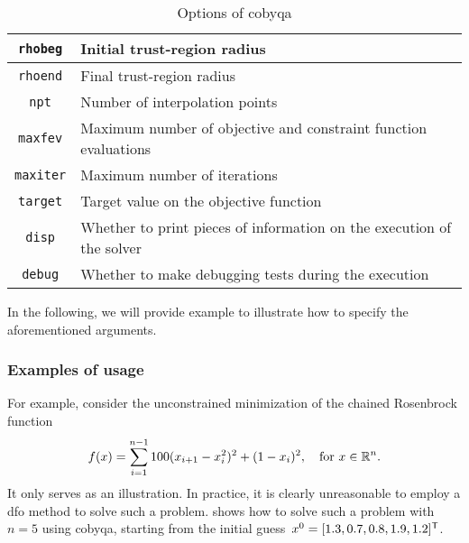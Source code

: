 \begin{table}[ht]
    \caption{Options of \gls{cobyqa}}
    \label{tab:cobyqa-options}
    \centering
    \begin{tabularx}{\textwidth}{cX}
        \toprule
        \texttt{rhobeg}     & Initial trust-region radius\\
        \midrule
        \texttt{rhoend}     & Final trust-region radius\\
        \midrule
        \texttt{npt}        & Number of interpolation points\\
        \midrule
        \texttt{maxfev}     & Maximum number of objective and constraint function evaluations\\
        \midrule
        \texttt{maxiter}    & Maximum number of iterations\\
        \midrule
        \texttt{target}     & Target value on the objective function\\
        \midrule
        \texttt{disp}       & Whether to print pieces of information on the execution of the solver\\
        \midrule
        \texttt{debug}      & Whether to make debugging tests during the execution\\
        \bottomrule
    \end{tabularx}
\end{table}

In the following, we will provide example to illustrate how to specify the aforementioned arguments.

\subsubsection{Examples of usage}

For example, consider the unconstrained minimization of the chained Rosenbrock function
\begin{equation*}
    f(x) = \sum_{i = 1}^{n - 1} 100(x_{i + 1} - x_i^2)^2 + (1 - x_i)^2, \quad \text{for~$x \in \mathbb{R}^n$.}
\end{equation*}
It only serves as an illustration.
In practice, it is clearly unreasonable to employ a \gls{dfo} method to solve such a problem.
 shows how to solve such a problem with~$n = 5$ using \gls{cobyqa}, starting from the initial guess~$\iter[0] = [1.3, 0.7, 0.8, 1.9, 1.2]^{\T}$.

